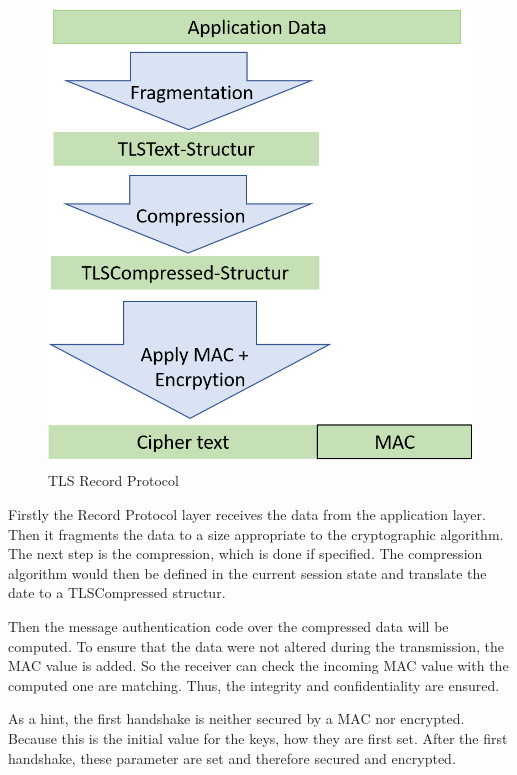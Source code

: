 \begin{figure}[H]
	\centering
		\includegraphics[scale=0.5]{images/tls_recordprotocol.png}
	\caption{TLS Record Protocol}
	\label{fig:tls_recordprotocol}
\end{figure}

Firstly the Record Protocol layer receives the data from the application layer. Then it fragments the data to a size appropriate to the cryptographic algorithm. 
The next step is the compression, which is done if specified. The compression algorithm would then be defined in the current session state and translate the date to a TLSCompressed structur.
 
Then the message authentication code over the compressed data will be computed.
To ensure that the data were not altered during the transmission, the MAC value is added. So the receiver can check the incoming MAC value with the computed one are matching. Thus, the integrity and confidentiality are ensured.

As a hint, the first handshake is neither secured by a MAC nor encrypted. Because this is the initial value for the keys, how they are first set. After the first handshake, these parameter are set and therefore secured and encrypted.
\cite{ms:Record}

